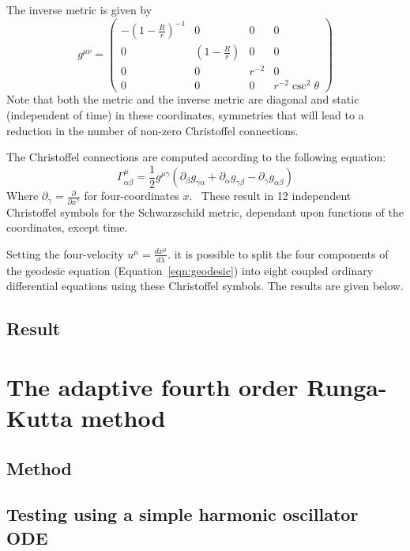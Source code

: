 \documentclass{article}
\begin{document}
The inverse metric is given by
\begin{equation}
g^{\mu\nu}=
\begin{pmatrix}
-(1-\frac{R}{r})^{-1} & 0 & 0 & 0\\
0 & (1-\frac{R}{r}) & 0 & 0 \\
0 & 0 & r^{-2} &0 \\
0 & 0 & 0 & r^{-2}\csc^2\theta
\end{pmatrix}
\label{eqn:invgschw}
\end{equation}
Note that both the metric and the inverse metric are diagonal and static (independent of time) in these coordinates, symmetries that will lead to a reduction in the number of non-zero Christoffel connections. 

The Christoffel connections are computed according to the following equation:
\begin{equation}
\Gamma^\mu_{\alpha\beta}=\frac{1}{2}g^{\mu\gamma}(\partial_\beta g_{\gamma\alpha} + \partial_\alpha g_{\gamma\beta} - \partial_\gamma g_{\alpha\beta})
\label{eqn:Gamma}
\end{equation}
Where $\partial_\gamma=\frac{\partial}{\partial x^\gamma}$ for
four-coordinates $x$.~\cite{ref:Carrol}  These result in 12 independent Christoffel symbols for the Schwarzschild metric, dependant upon functions of the coordinates, except time. 

Setting the four-velocity $u^\mu = \frac{dx^\mu}{d\lambda}$. it is
possible to split the four components of the geodesic equation
(Equation~\ref{eqn:geodesic}) into eight coupled ordinary differential
equations using these Christoffel symbols. The results are given below. 


\subsection{Result}




\section{The adaptive fourth order Runga-Kutta method}
\subsection{Method}
\subsection{Testing using a simple harmonic oscillator ODE}
\end{document}
